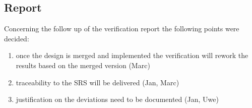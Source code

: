\documentclass{article}
\begin{document}
\subsection{Report}
Concerning the follow up of the verification report the following points were decided:
\begin{enumerate} Verification report is to be written (Marc, Jan Welte, Jens Gerlach, Bernd Gonska)
\item once the design is merged and implemented the verification will rework the results based on the merged version (Marc)
\item  traceability to the SRS will be delivered (Jan, Marc)
\item  justification on the deviations need to be documented (Jan, Uwe)
\end{enumerate}
               


\end{document}
